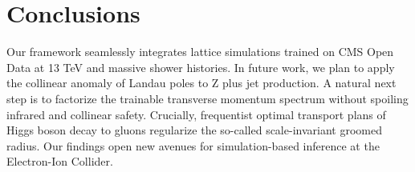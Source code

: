 \section{Conclusions}\label{sec:conclusions}

Our framework seamlessly integrates lattice simulations trained on CMS
Open Data at 13 TeV and massive shower histories. In future work, we
plan to apply the collinear anomaly of Landau poles to Z plus jet
production. A natural next step is to factorize the trainable transverse
momentum spectrum without spoiling infrared and collinear safety.
Crucially, frequentist optimal transport plans of Higgs boson decay to
gluons regularize the so-called scale-invariant groomed radius. Our
findings open new avenues for simulation-based inference at the
Electron-Ion Collider.

